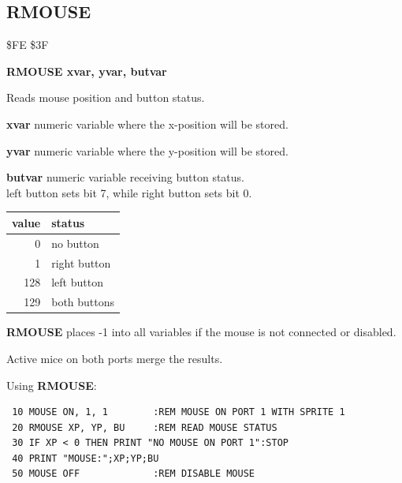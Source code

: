 \subsection{RMOUSE}
\begin{description}[leftmargin=2cm,style=nextline]
\item [Token:] \$FE \$3F
\item [Format:] {\bf RMOUSE xvar, yvar, butvar}
\item [Usage:] Reads mouse position and button status.

               {\bf xvar} numeric variable where the x-position will be stored.

               {\bf yvar} numeric variable where the y-position will be stored.

               {\bf butvar} numeric variable receiving button status. \\
               left button sets bit 7, while right button sets bit 0.

\begin{center}
{\setlength{\tabcolsep}{1mm}
\ttfamily
\begin{tabular}{|r|l|}
\hline
 value  & status \\
\hline
  0 & no button \\
  1 & right button \\
128 & left button \\
129 & both buttons \\
\hline
\end{tabular}
}
\end{center}

{\bf RMOUSE} places -1 into all variables
if the mouse is not connected or disabled.

\item [Remarks:] Active mice on both ports merge the results.
\item [Example:] Using {\bf RMOUSE}:
\begin{tcolorbox}[colback=black,coltext=white]
\verbatimfont{\codefont}
\begin{verbatim}
 10 MOUSE ON, 1, 1        :REM MOUSE ON PORT 1 WITH SPRITE 1
 20 RMOUSE XP, YP, BU     :REM READ MOUSE STATUS
 30 IF XP < 0 THEN PRINT "NO MOUSE ON PORT 1":STOP
 40 PRINT "MOUSE:";XP;YP;BU
 50 MOUSE OFF             :REM DISABLE MOUSE
\end{verbatim}
\end{tcolorbox}
\end{description}

